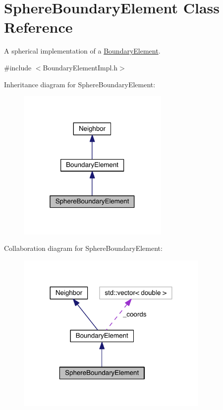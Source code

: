 \hypertarget{classSphereBoundaryElement}{\section{Sphere\+Boundary\+Element Class Reference}
\label{classSphereBoundaryElement}
}


A spherical implementation of a \hyperlink{classBoundaryElement}{Boundary\+Element}.  




{\ttfamily \#include $<$Boundary\+Element\+Impl.\+h$>$}



Inheritance diagram for Sphere\+Boundary\+Element\+:
\nopagebreak
\begin{figure}[H]
\begin{center}
\leavevmode
\includegraphics[width=208pt]{classSphereBoundaryElement__inherit__graph}
\end{center}
\end{figure}


Collaboration diagram for Sphere\+Boundary\+Element\+:
\nopagebreak
\begin{figure}[H]
\begin{center}
\leavevmode
\includegraphics[width=264pt]{classSphereBoundaryElement__coll__graph}
\end{center}
\end{figure}
